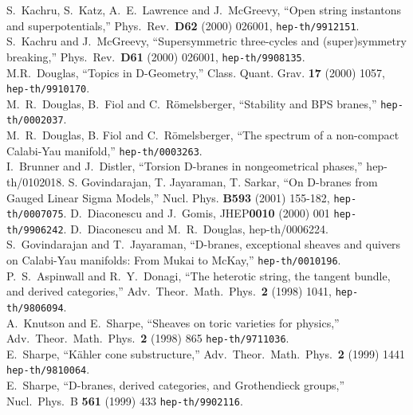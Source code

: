 \documentclass[a4paper,12pt]{article}
\begin{document}
\begin{thebibliography}{99}
S.~Kachru, S.~Katz, A.~E.~Lawrence and J.~McGreevy,
``Open string instantons and superpotentials,''
Phys.\ Rev.\ {\bf D62} (2000) 026001,
{\tt hep-th/9912151}. \\
S.~Kachru and J.~McGreevy,
``Supersymmetric three-cycles and (super)symmetry breaking,''
Phys.\ Rev.\ {\bf D61} (2000) 026001,
{\tt hep-th/9908135}.\\
M.R.~Douglas, ``Topics in D-Geometry,''
Class. Quant. Grav. {\bf 17} (2000) 1057, {\tt hep-th/9910170}. \\
M.~R.~Douglas, B.~Fiol and C.~R\"omelsberger,
``Stability and BPS branes,'' {\tt hep-th/0002037}. \\
M.~R.~Douglas, B. Fiol and C.~R\"omelsberger, ``The
spectrum
of a non-compact Calabi-Yau manifold,'' {\tt hep-th/0003263}. \\
I.~Brunner and J.~Distler,
``Torsion D-branes in nongeometrical phases,''
hep-th/0102018.
 S. Govindarajan, T. Jayaraman, T. Sarkar, ``On D-branes
from Gauged Linear Sigma Models,'' 
Nucl. Phys. {\bf B593} (2001) 155-182, {\tt hep-th/0007075}. 
D.~Diaconescu and J.~Gomis,
JHEP{\bf 0010} (2000) 001
{\tt hep-th/9906242}.
D.~Diaconescu and M.~R.~Douglas,
hep-th/0006224. 
S.~Govindarajan and T.~Jayaraman,
``D-branes, exceptional sheaves and quivers on Calabi-Yau manifolds:
{}From  Mukai to McKay,'' {\tt hep-th/0010196}.
P.~S.~Aspinwall and R.~Y.~Donagi,
``The heterotic string, the tangent bundle, and derived categories,''
Adv.\ Theor.\ Math.\ Phys.\ {\bf 2} (1998) 1041,
{\tt hep-th/9806094}. \\
A.~Knutson and E.~Sharpe,
``Sheaves on toric varieties for physics,''
Adv.\ Theor.\ Math.\ Phys.\ {\bf 2} (1998) 865
{\tt hep-th/9711036}. \\
E.~Sharpe,
``K\"ahler cone substructure,''
Adv.\ Theor.\ Math.\ Phys.\ {\bf 2} (1999) 1441
{\tt hep-th/9810064}. \\
E.~Sharpe,
``D-branes, derived categories, and Grothendieck groups,''
Nucl.\ Phys.\ B {\bf 561} (1999) 433
{\tt hep-th/9902116}. \\

\end{thebibliography}
\end{document}
